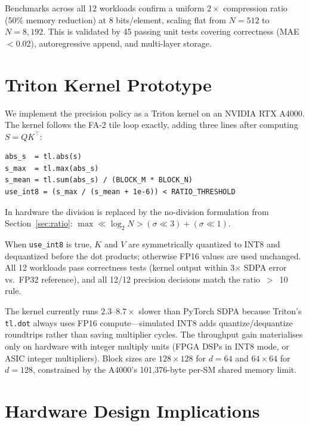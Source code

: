 \documentclass[10pt,twocolumn]{article}
\begin{document}
Benchmarks across all 12 workloads confirm a uniform $2\times$
compression ratio (50\% memory reduction) at 8 bits/element, scaling
flat from $N=512$ to $N=8{,}192$. This is validated by 45 passing unit
tests covering correctness (MAE $<$0.02), autoregressive append, and
multi-layer storage.

\section{Triton Kernel Prototype}

We implement the precision policy as a Triton kernel on an NVIDIA RTX
A4000. The kernel follows the FA-2 tile loop exactly, adding three
lines after computing $S = QK^\top$:

\begin{lstlisting}[caption={Precision decision inside the Triton tile loop (software).}]
abs_s  = tl.abs(s)
s_max  = tl.max(abs_s)
s_mean = tl.sum(abs_s) / (BLOCK_M * BLOCK_N)
use_int8 = (s_max / (s_mean + 1e-6)) < RATIO_THRESHOLD
\end{lstlisting}

In hardware the division is replaced by the no-division formulation
from Section~\ref{sec:ratio}: $\max \ll \log_2 N > (\sigma \ll 3) + (\sigma \ll 1)$.

When \texttt{use\_int8} is true, $K$ and $V$ are symmetrically
quantized to INT8 and dequantized before the dot products; otherwise
FP16 values are used unchanged. All 12 workloads pass correctness
tests (kernel output within 3$\times$ SDPA error vs.\ FP32 reference),
and all 12/12 precision decisions match the ratio~$>$~10 rule.

The kernel currently runs $2.3$--$8.7\times$ slower than PyTorch SDPA
because Triton's \texttt{tl.dot} always uses FP16 compute---simulated
INT8 adds quantize/dequantize roundtrips rather than saving multiplier
cycles. The throughput gain materialises only on hardware with integer
multiply units (FPGA DSPs in INT8 mode, or ASIC integer multipliers).
Block sizes are $128\times128$ for $d=64$ and $64\times64$ for $d=128$,
constrained by the A4000's 101{,}376-byte per-SM shared memory limit.

\section{Hardware Design Implications}
\end{document}
